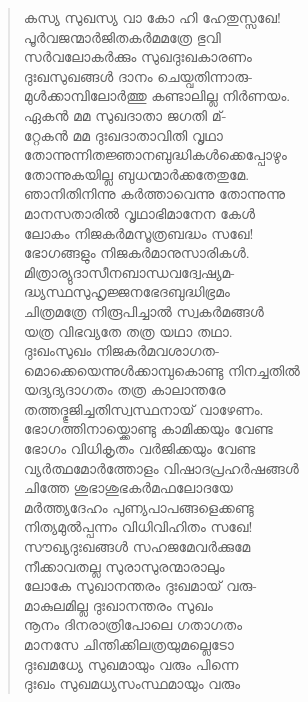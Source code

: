 \begin{verse}
കസ്യ സുഖസ്യ വാ കോ ഹി ഹേതുസ്സഖേ!\\
പൂര്‍വജന്മാര്‍ജിതകര്‍മമത്രേ ഭുവി\\
സര്‍വലോകര്‍ക്കും സുഖദുഃഖകാരണം\\
ദുഃഖസുഖങ്ങള്‍ ദാനം ചെയ്വതിന്നാരു-\\
മുള്‍ക്കാമ്പിലോര്‍ത്തു കണ്ടാലില്ല നിര്‍ണയം.\\
ഏകന്‍ മമ സുഖദാതാ ജഗതി മ്-\\
റ്റേകന്‍ മമ ദുഃഖദാതാവിതി വൃഥാ\\
തോന്നുന്നിതജ്ഞാനബുദ്ധികള്‍ക്കെപ്പോഴും\\
തോന്നുകയില്ല ബുധന്മാര്‍ക്കതേതുമേ.\\
ഞാനിതിനിന്നു കര്‍ത്താവെന്നു തോന്നുന്നു\\
മാനസതാരില്‍ വൃഥാഭിമാനേന കേള്‍\\
ലോകം നിജകര്‍മസൂത്രബദ്ധം സഖേ!\\
ഭോഗങ്ങളും നിജകര്‍മാനുസാരികള്‍.\\
മിത്രാര്യുദാസീനബാന്ധവദ്വേഷ്യമ-\\
ദ്ധ്യസ്ഥസുഹൃജ്ജനഭേദബുദ്ധിഭ്രമം\\
ചിത്രമത്രേ നിരൂപിച്ചാല്‍ സ്വകര്‍മങ്ങള്‍\\
യത്ര വിഭവ്യതേ തത്ര യഥാ തഥാ.\\
ദുഃഖംസുഖം നിജകര്‍മവശാഗത-\\
മൊക്കെയെന്നുള്‍ക്കാമ്പുകൊണ്ടു നിനച്ചതില്‍\\
യദ്യദ്യദാഗതം തത്ര കാലാന്തരേ\\
തത്തദ്ഭുജിച്ചതിസ്വസ്ഥനായ് വാഴേണം.\\
ഭോഗത്തിനായ്ക്കൊണ്ടു കാമിക്കയും വേണ്ട\\
ഭോഗം വിധികൃതം വര്‍ജിക്കയും വേണ്ട\\
വ്യര്‍ത്ഥമോര്‍ത്തോളം വിഷാദപ്രഹര്‍ഷങ്ങള്‍\\
ചിത്തേ ശുഭാശുഭകര്‍മഫലോദയേ\\
മര്‍ത്ത്യദേഹം പുണ്യപാപങ്ങളെക്കണ്ടു\\
നിത്യമുല്‍പ്പന്നം വിധിവിഹിതം സഖേ!\\
സൗഖ്യദുഃഖങ്ങള്‍ സഹജമേവര്‍ക്കുമേ\\
നീക്കാവതല്ല സുരാസുരന്മാരാലും\\
ലോകേ സുഖാനന്തരം ദുഃഖമായ് വരു-\\
മാകുലമില്ല ദുഃഖാനന്തരം സുഖം\\
നൂനം ദിനരാത്രിപോലെ ഗതാഗതം\\
മാനസേ ചിന്തിക്കിലത്രയുമല്ലെടോ\\
ദുഃഖമധ്യേ സുഖമായും വരും പിന്നെ\\
ദുഃഖം സുഖമധ്യസംസ്ഥമായും വരും\\

\end{verse}
